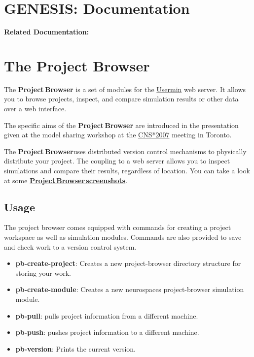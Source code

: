 \documentclass[12pt]{article}
\begin{document}
\section*{GENESIS: Documentation}

{\bf Related Documentation:}

\section*{The Project Browser}

The {\bf Project\,Browser} is a set of modules for the \href{http://www.webmin.com/usermin.html}{Usermin} web server. It allows you to browse projects, inspect, and compare simulation results or other data over a web interface.

The specific aims of the {\bf Project\,Browser} are introduced in the presentation given at the model sharing workshop at the \href{../cns07-poster/cns07-poster.pdf}{CNS*2007} meeting in Toronto.

The {\bf Project\,Browser}uses distributed version control mechanisms to physically distribute your project. The coupling to a web server allows you to inspect simulations and compare their results, regardless of location. You can take a look at some \href{../project-browser-screenshots/project-browser-screenshots.tex}{\bf Project\,Browser\,screenshots}. 

\subsection*{Usage}

The project browser comes equipped with commands for creating a project workspace as well as simulation modules. Commands are also provided to save and check work to a version control system.

\begin{itemize}
\item[] {\bf pb-create-project}: Creates a new project-browser directory structure for storing your work.
\item[] {\bf pb-create-module}: Creates a new neurospaces project-browser simulation module.
\item[] {\bf pb-pull}: pulls project information from a different machine.
\item[] {\bf pb-push}: pushes project information to a different machine.
\item[] {\bf pb-version}: Prints the current version. 
\end{itemize}
\end{document}
